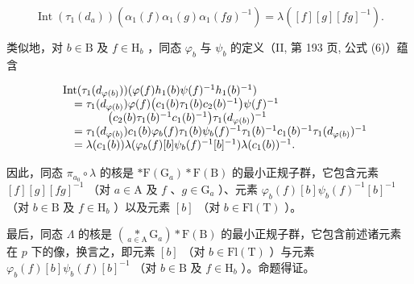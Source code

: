 \[
\operatorname{Int} \left(\tau_ {1} \left(d _ {a}\right)\right) \left(\alpha_ {1} (f) \alpha_ {1} (g) \alpha_ {1} (f g) ^ {- 1}\right) = \lambda ([ f ] [ g ] [ f g ] ^ {- 1}).
\]

类似地，对 \(b \in \mathrm{B}\) 及 \(f \in \mathrm{H}_b\) ，同态 \(\varphi_b\) 与 \(\psi_b\) 的定义（II, 第 193 页, 公式 (6)）蕴含

\[
\begin{array}{r l} & {\mathrm{Int} (\tau_ {1} (d _ {\varphi (b)})) (\varphi (f) h _ {1} (b) \psi (f) ^ {- 1} h _ {1} (b) ^ {- 1})} \\ & {\quad = \tau_ {1} (d _ {\varphi (b)}) \varphi (f) \big (c _ {1} (b) \tau_ {1} (b) c _ {2} (b) ^ {- 1} \big) \psi (f) ^ {- 1}} \\ & {\qquad \qquad \big (c _ {2} (b) \tau_ {1} (b) ^ {- 1} c _ {1} (b) ^ {- 1} \big) \tau_ {1} (d _ {\varphi (b)}) ^ {- 1}} \\ & {\quad = \tau_ {1} (d _ {\varphi (b)}) c _ {1} (b) \varphi_ {b} (f) \tau_ {1} (b) \psi_ {b} (f) ^ {- 1} \tau_ {1} (b) ^ {- 1} c _ {1} (b) ^ {- 1} \tau_ {1} (d _ {\varphi (b)}) ^ {- 1}} \\ & {\quad = \lambda (c _ {1} (b)) \lambda (\varphi_ {b} (f) [ b ] \psi_ {b} (f) ^ {- 1} [ b ] ^ {- 1}) \lambda (c _ {1} (b)) ^ {- 1}.} \end{array}
\]

因此，同态 \(\pi_{a_0} \circ \lambda\) 的核是 \(*\mathrm{F}(\mathrm{G}_a) * \mathrm{F}(\mathrm{B})\) 的最小正规子群，它包含元素 \([f][g][fg]^{-1}\) （对 \(a \in \mathrm{A}\) 及 \(f\) 、\(g \in \mathrm{G}_a\) ）、元素 \(\varphi_b(f)[b]\psi_b(f)^{-1}[b]^{-1}\) （对 \(b \in \mathrm{B}\) 及 \(f \in \mathrm{H}_b\) ）以及元素 \([b]\) （对 \(b \in \mathrm{Fl}(\mathrm{T})\) ）。

最后，同态 \(\Lambda\) 的核是 \((\underset{a\in\mathrm{A}}{*}\mathrm{G}_{a})*\mathrm{F}(\mathrm{B})\) 的最小正规子群，它包含前述诸元素在 \(p\) 下的像，换言之，即元素 \([b]\) （对 \(b\in\mathrm{Fl}(\mathrm{T})\) ）与元素 \(\varphi_{b}(f)[b]\psi_{b}(f)[b]^{-1}\) （对 \(b\in\mathrm{B}\) 及 \(f\in\mathrm{H}_{b}\) ）。命题得证。

